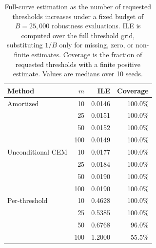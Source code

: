 \begin{table}[ht!]
    \centering
    \caption{
    Full-curve estimation as the number of requested thresholds increases under a fixed budget of $B=25{,}000$ robustness evaluations. ILE is computed over the full threshold grid, substituting $1/B$ only for missing, zero, or non-finite estimates. Coverage is the fraction of requested thresholds with a finite positive estimate. Values are medians over 10 seeds.
    }
    \label{tab:exp1-full-results}
    \begin{tabular}{@{}lrrr@{}}
        \toprule
        Method & $m$ & ILE & Coverage \\
        \midrule
        Amortized
            & 10  & 0.0146 & 100.0\% \\
            & 25  & 0.0151 & 100.0\% \\
            & 50  & 0.0152 & 100.0\% \\
            & 100 & 0.0149 & 100.0\% \\
        \midrule
        Unconditional CEM
            & 10  & 0.0177 & 100.0\% \\
            & 25  & 0.0184 & 100.0\% \\
            & 50  & 0.0190 & 100.0\% \\
            & 100 & 0.0190 & 100.0\% \\
        \midrule
        Per-threshold
            & 10  & 0.4628 & 100.0\% \\
            & 25  & 0.5385 & 100.0\% \\
            & 50  & 0.6768 & 96.0\% \\
            & 100 & 1.2000 & 55.5\% \\
        \bottomrule
    \end{tabular}
\end{table}

